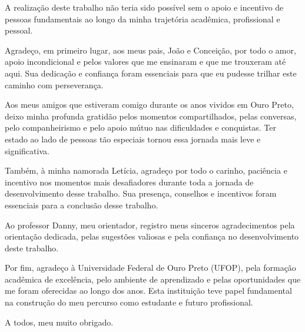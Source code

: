\documentclass[
	12pt,				%
	openright,			%
	oneside,			%
	a4paper,			%
	english,			%
	brazil				%
	]{abntex2}
\begin{document}
\imprimirfolhaderosto

%     


%


\begin{agradecimentos}
\noindent A realização deste trabalho não teria sido possível sem o apoio e incentivo de pessoas fundamentais ao longo da minha trajetória acadêmica, profissional e pessoal.

\noindent Agradeço, em primeiro lugar, aos meus pais, João e Conceição, por todo o amor, apoio incondicional e pelos valores que me ensinaram e que me trouxeram até aqui. Sua dedicação e confiança foram essenciais para que eu pudesse trilhar este caminho com perseverança.

\noindent Aos meus amigos que estiveram comigo durante os anos vividos em Ouro Preto, deixo minha profunda gratidão pelos momentos compartilhados, pelas conversas, pelo companheirismo e pelo apoio mútuo nas dificuldades e conquistas. Ter estado ao lado de pessoas tão especiais tornou essa jornada mais leve e significativa. 

\noindent Também, à minha namorada Letícia, agradeço por todo o carinho, paciência e incentivo nos momentos mais desafiadores durante toda a jornada de desenvolvimento desse trabalho. Sua presença, conselhos e incentivos foram essenciais para a conclusão desse trabalho.

\noindent Ao professor Danny, meu orientador, registro meus sinceros agradecimentos pela orientação dedicada, pelas sugestões valiosas e pela confiança no desenvolvimento deste trabalho. 

\noindent Por fim, agradeço à Universidade Federal de Ouro Preto (UFOP), pela formação acadêmica de excelência, pelo ambiente de aprendizado e pelas oportunidades que me foram oferecidas ao longo dos anos. Esta instituição teve papel fundamental na construção do meu percurso como estudante e futuro profissional.

\noindent A todos, meu muito obrigado.

\end{agradecimentos}
\end{document}
